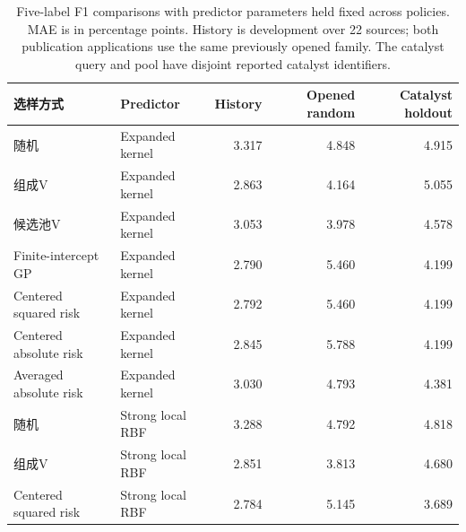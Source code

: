 \begin{table}[htbp]\centering\small
\caption{Five-label F1 comparisons with predictor parameters held fixed across policies. MAE is in percentage points. History is development over 22 sources; both publication applications use the same previously opened family. The catalyst query and pool have disjoint reported catalyst identifiers.}\label{tab:step10matched}
\begin{tabular}{llrrr}\toprule
选样方式 & Predictor & History & Opened random & Catalyst holdout \\ \midrule
随机 & Expanded kernel & 3.317 & 4.848 & 4.915 \\
组成V & Expanded kernel & 2.863 & 4.164 & 5.055 \\
候选池V & Expanded kernel & 3.053 & 3.978 & 4.578 \\
Finite-intercept GP & Expanded kernel & 2.790 & 5.460 & 4.199 \\
Centered squared risk & Expanded kernel & 2.792 & 5.460 & 4.199 \\
Centered absolute risk & Expanded kernel & 2.845 & 5.788 & 4.199 \\
Averaged absolute risk & Expanded kernel & 3.030 & 4.793 & 4.381 \\
随机 & Strong local RBF & 3.288 & 4.792 & 4.818 \\
组成V & Strong local RBF & 2.851 & 3.813 & 4.680 \\
Centered squared risk & Strong local RBF & 2.784 & 5.145 & 3.689 \\
\bottomrule\end{tabular}
\end{table}
